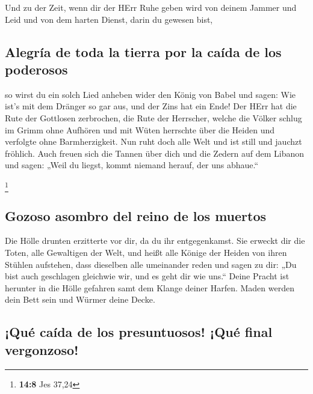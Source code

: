  Und zu der Zeit, wenn dir der HErr Ruhe geben wird von
deinem Jammer und Leid und von dem harten Dienst, darin du gewesen bist,

\hypertarget{alegruxeda-de-toda-la-tierra-por-la-cauxedda-de-los-poderosos}{%
\subsection{Alegría de toda la tierra por la caída de los
poderosos}\label{alegruxeda-de-toda-la-tierra-por-la-cauxedda-de-los-poderosos}}

 so wirst du ein solch Lied anheben wider den König von
Babel und sagen: Wie ist's mit dem Dränger so gar aus, und der Zins hat
ein Ende!  Der HErr hat die Rute der Gottlosen zerbrochen,
die Rute der Herrscher,  welche die Völker schlug im Grimm
ohne Aufhören und mit Wüten herrschte über die Heiden und verfolgte ohne
Barmherzigkeit.  Nun ruht doch alle Welt und ist still und
jauchzt fröhlich.  Auch freuen sich die Tannen über dich
und die Zedern auf dem Libanon und sagen: „Weil du liegst, kommt niemand
herauf, der uns abhaue.``

\footnote{\textbf{14:8} Jes 37,24}

\hypertarget{gozoso-asombro-del-reino-de-los-muertos}{%
\subsection{Gozoso asombro del reino de los
muertos}\label{gozoso-asombro-del-reino-de-los-muertos}}

 Die Hölle drunten erzitterte vor dir, da du ihr
entgegenkamst. Sie erweckt dir die Toten, alle Gewaltigen der Welt, und
heißt alle Könige der Heiden von ihren Stühlen aufstehen,
 dass dieselben alle umeinander reden und sagen zu dir:
„Du bist auch geschlagen gleichwie wir, und es geht dir wie uns.``
 Deine Pracht ist herunter in die Hölle gefahren samt dem
Klange deiner Harfen. Maden werden dein Bett sein und Würmer deine
Decke.

\hypertarget{quuxe9-cauxedda-de-los-presuntuosos-quuxe9-final-vergonzoso}{%
\subsection{¡Qué caída de los presuntuosos! ¡Qué final
vergonzoso!}\label{quuxe9-cauxedda-de-los-presuntuosos-quuxe9-final-vergonzoso}}

